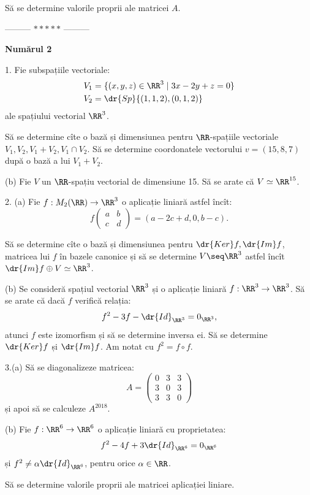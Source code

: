 Să se determine valorile proprii ale matricei $ A $.

\vspace{0.5cm}
\begin{center}
  --------- $\ast\ast\ast\ast\ast$ ---------
\end{center}
\vspace{0.5cm}

\textbf{Numărul 2}

1. Fie subspațiile vectoriale:
\begin{align*}
  V_1 &= \{ (x, y, z) \in \RR^3 \mid 3x - 2y + z = 0 \} \\
  V_2 &= \dr{Sp}\{(1, 1, 2), (0, 1, 2) \}
\end{align*}
ale spațiului vectorial $ \RR^3 $.

Să se determine cîte o bază și dimensiunea pentru $ \RR $-spațiile vectoriale
$ V_1, V_2, V_1 + V_2, V_1 \cap V_2 $. Să se determine coordonatele
vectorului $ v = (15, 8, 7) $ după o bază a lui $ V_1 + V_2 $.

(b) Fie $ V $ un $ \RR $-spațiu vectorial de dimensiune 15. Să se arate
că $ V \simeq \RR^{15} $.

\vspace{0.5cm}

2. (a) Fie $ f : M_2(\RR) \to \RR^3 $ o aplicație liniară astfel încît:
\[
  f \begin{pmatrix} a & b \\ c & d \end{pmatrix} = (a - 2c + d, 0, b - c).
\]

Să se determine cîte o bază și dimensiunea pentru $ \dr{Ker} f, \dr{Im}f $,
matricea lui $ f $ în bazele canonice și să se determine $ V \seq \RR^3 $
astfel încît $ \dr{Im}f \oplus V \simeq \RR^3 $.

(b) Se consideră spațiul vectorial $ \RR^3 $ și o aplicație liniară
$ f : \RR^3 \to \RR^3 $. Să se arate că dacă $ f $ verifică relația:
\[
  f^2 - 3f - \dr{Id}_{\RR^3} = 0_{\RR^3},
\]
atunci $ f $ este izomorfism și să se determine inversa ei. Să se determine
$ \dr{Ker}f $ și $ \dr{Im}f $. Am notat cu $ f^2 = f \circ f $.

\vspace{0.5cm}

3.(a) Să se diagonalizeze matricea:
\[
  A = \begin{pmatrix}
    0 & 3 & 3 \\
    3 & 0 & 3 \\
    3 & 3 & 0
  \end{pmatrix}
\]
și apoi să se calculeze $ A^{2018} $.

(b) Fie $ f : \RR^6 \to \RR^6 $ o aplicație liniară cu proprietatea:
\[
  f^2 - 4f + 3 \dr{Id}_{\RR^6} = 0_{\RR^6}
\]
și $ f^2 \neq \alpha \dr{Id}_{\RR^6} $, pentru orice $ \alpha \in \RR $.

Să se determine valorile proprii ale matricei aplicației liniare.

